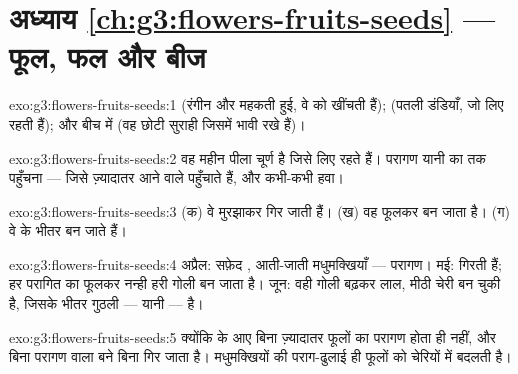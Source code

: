 \section*{अध्याय \ref{ch:g3:flowers-fruits-seeds} --- फूल, फल और बीज}

\begin{solution}{exo:g3:flowers-fruits-seeds:1}
 (रंगीन और महकती हुई, वे  को खींचती हैं);  (पतली
डंडियाँ, जो  लिए रहती हैं); और बीच में  (वह छोटी सुराही
जिसमें भावी  रखे हैं)।
\end{solution}

\begin{solution}{exo:g3:flowers-fruits-seeds:2}
 वह महीन पीला चूर्ण है जिसे  लिए रहते हैं। परागण यानी 
का  तक पहुँचना --- जिसे ज़्यादातर आने वाले  पहुँचाते हैं,
और कभी-कभी हवा।
\end{solution}

\begin{solution}{exo:g3:flowers-fruits-seeds:3}
(क) वे मुरझाकर गिर जाती हैं। (ख) वह फूलकर  बन जाता है। (ग) वे  के
भीतर  बन जाते हैं।
\end{solution}

\begin{solution}{exo:g3:flowers-fruits-seeds:4}
अप्रैल: सफ़ेद , आती-जाती मधुमक्खियाँ --- परागण। मई: 
गिरती हैं; हर परागित  का  फूलकर नन्ही हरी गोली बन जाता
है। जून: वही गोली बढ़कर लाल, मीठी चेरी बन चुकी है, जिसके भीतर गुठली
--- यानी  --- है।
\end{solution}

\begin{solution}{exo:g3:flowers-fruits-seeds:5}
क्योंकि  के आए बिना ज़्यादातर फूलों का परागण होता ही नहीं, और बिना
परागण वाला   बने बिना गिर जाता है। मधुमक्खियों की पराग-ढुलाई ही
फूलों को चेरियों में बदलती है।
\end{solution}

